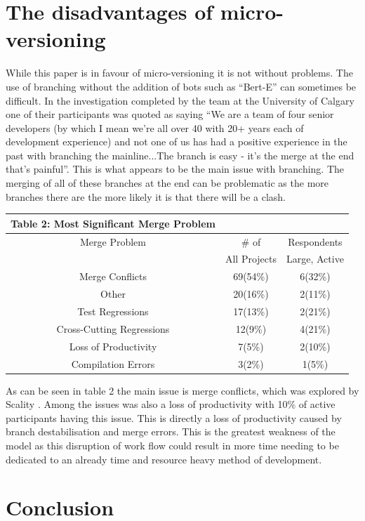 \documentclass{scrartcl}
\begin{document}
{\section{The disadvantages of micro-versioning}
While this paper is in favour of micro-versioning it is not without problems. The use of branching without the addition of bots such as ``Bert-E'' can sometimes be difficult. In the investigation completed by the team at the University of Calgary one of their participants was quoted as saying ``We are a team of four senior developers (by
which I mean we’re all over 40 with 20+ years
each of development experience) and not one of
us has had a positive experience in the past with
branching the mainline...The branch is easy - it’s
the merge at the end that’s painful''\cite{phillips2011branching}. This is what appears to be the main issue with branching. The merging of all of these branches at the end can be problematic as the more branches there are the more likely it is that there will be a clash.
\begin{center}
	\begin{tabular}{c c c}
		\hline
		Table 2: Most Significant Merge Problem \cite{phillips2011branching} \\
		\hline
		Merge Problem & \# of & Respondents \\
		& All Projects & Large, Active \\
		\hline
		Merge Conflicts & 69(54\%) & 6(32\%) \\
		Other & 20(16\%) & 2(11\%) \\
		Test Regressions & 17(13\%) & 2(21\%)\\
		Cross-Cutting Regressions & 12(9\%) & 4(21\%) \\
		Loss of Productivity & 7(5\%) & 2(10\%) \\
		Compilation Errors & 3(2\%) & 1(5\%) \\
		\hline
	\end{tabular}
\end{center}
As can be seen in table 2 the main issue is merge conflicts, which was explored by Scality \cite{GitWaterFlow}. Among the issues was also a loss of productivity with 10\% of active participants having this issue. This is directly a loss of productivity caused by branch destabilisation and merge errors. This is the greatest weakness of the model as this disruption of work flow could result in more time needing to be dedicated to an already time and resource heavy method of development.
\section{Conclusion}

}
\end{document}
